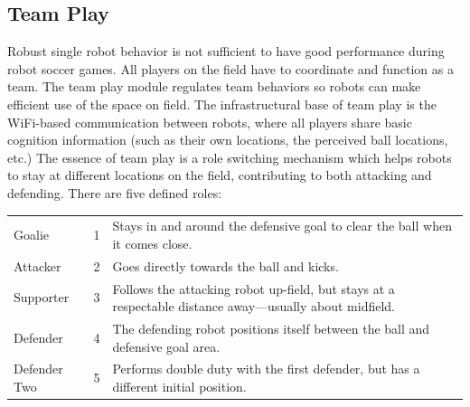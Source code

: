 \documentclass{article}
\begin{document}
\subsection{Team Play}
	Robust single robot behavior is not sufficient to have good performance during robot soccer games. All players on the field have to coordinate and function as a team. The team play module regulates team behaviors so robots can make efficient use of the space on field. The infrastructural base of team play is the WiFi-based communication between robots, where all players share basic cognition information (such as their own locations, the perceived ball locations, etc.) The essence of team play is a role switching mechanism which helps robots to stay at different locations on the field, contributing to both attacking and defending. There are five defined roles: 

	\begin{center}
		\begin{tabular}{ l c p{7cm} } %
			Goalie & 1 & Stays in and around the defensive goal to clear the ball when it comes close. \\
			Attacker & 2 & Goes directly towards the ball and kicks. \\
			Supporter & 3 & Follows the attacking robot up-field, but stays at a respectable distance away---usually about midfield. \\
			Defender & 4 & The defending robot positions itself between the ball and defensive goal area. \\					Defender Two & 5 & Performs double duty with the first defender, but has a different initial position. \\
		\end{tabular}
	\end{center}
\end{document}
